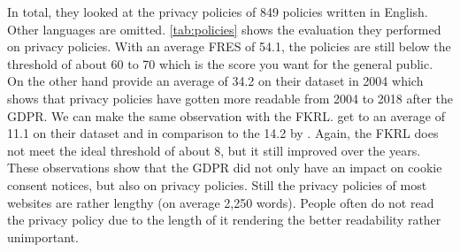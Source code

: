 In total, they looked at the privacy policies of 849 policies written in English. Other languages are omitted.
\autoref{tab:policies} shows the evaluation they performed on privacy policies. With an average FRES of 54.1, the
policies are still below the threshold of about 60 to 70 which is the score you want for the general public. On the
other hand  provide an average of 34.2 on their dataset in 2004 which shows that privacy policies
have gotten more readable from 2004 to 2018 after the GDPR. We can make the same observation with the FKRL. \citeauthor{sanchez2019can} get to an average
of 11.1 on their dataset and in comparison to the 14.2 by . Again, the FKRL does not meet the
ideal threshold of about 8, but it still improved over the years. These observations show that the GDPR did not only have
an impact on cookie consent notices, but also on privacy policies. Still the privacy policies of most websites are
rather lengthy (on average 2,250 words). People often do not read the privacy policy due to the length of it rendering
the better readability rather unimportant.

